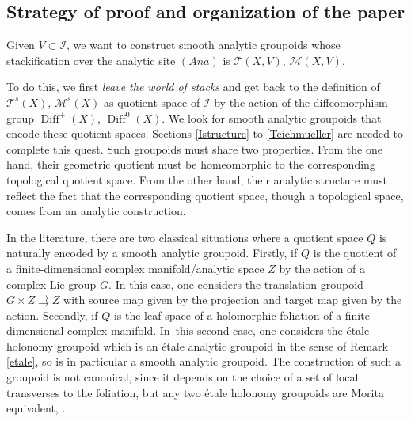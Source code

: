 \documentclass[JEP,XML,SOM,Unicode]{cedram}
\let\mathcal\mathscr
\newcommand{\Ana}{\mathit{Ana}}
\DeclareMathOperator{\Diff}{Diff}
\theoremstyle{plain}
\theoremstyle{definition}
\theoremstyle{remark}
\numberwithin{equation}{section}
\newcommand{\cI}{\mathcal{I}}
\begin{document}
\subsection{Strategy of proof and organization of the paper}
\label{strategy}
Given $V\subset \cI$, we want to construct smooth analytic groupoids whose stackification over the analytic site $(\Ana)$ is $\mathcal T(X,V)$, \resp $\mathcal M(X,V)$.

To do this, we first \emph{leave the world of stacks} and get back to the definition of $\mathcal T^s(X)$, \resp $\mathcal M^s(X)$ as quotient space of $\cI$ by the action of the diffeomorphism group $\Diff^+(X)$, \resp $\Diff^0(X)$. We look for smooth analytic groupoids that encode these quotient spaces. Sections \ref{Istructure} to \ref{Teichmueller} are needed to complete this quest. Such groupoids must share two properties. From the one hand, their geometric quotient must be homeomorphic to the corresponding topological quotient space. From the other hand, their analytic structure must reflect the fact that the corresponding quotient space, though a topological space, comes from an analytic construction.

In the literature, there are two classical situations where a quotient space $Q$ is naturally encoded by a smooth analytic groupoid. Firstly, if $Q$ is the quotient of a finite-dimensional complex manifold/analytic space $Z$ by the action of a complex Lie group $G$. In this case, one considers the translation groupoid $G\times Z\rightrightarrows Z$ with source map given by the projection and target map given by the action. Secondly, if $Q$ is the leaf space of a holomorphic foliation of a finite-dimensional complex manifold. In~this second case, one considers the étale holonomy groupoid which is an étale analytic groupoid in the sense of Remark \ref{etale}, so is in particular a smooth analytic groupoid. The construction of such a groupoid is not canonical, since it depends on the choice of a set of local transverses to the foliation, but any two étale holonomy groupoids are Morita equivalent, \cite[\S 5]{Moerdijk}.
\end{document}
